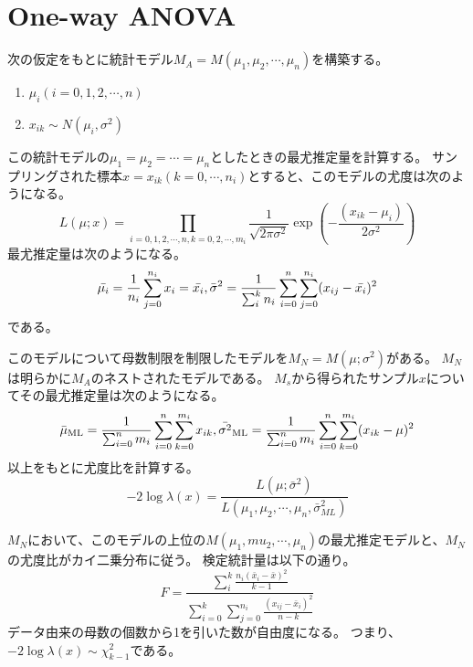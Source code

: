 \section{One-way ANOVA}
次の仮定をもとに統計モデル$M_A=M(\mu_1,\mu_2,\cdots,\mu_n)$を構築する。
\begin{enumerate}
    \item $\mu_i (i=0,1,2,\cdots,n)$
    \item $x_{ik} \sim N(\mu_i,\sigma^2)$
\end{enumerate}
この統計モデルの$\mu_1=\mu_2=\cdots=\mu_n$としたときの最尤推定量を計算する。
サンプリングされた標本$x = x_{ik} (k=0,\cdots,n_i)$とすると、このモデルの尤度は次のようになる。
\begin{equation*}
    L(\mu;x) = \prod_{i=0,1,2,\cdots,n,k=0,2,\cdots,m_i}\frac{1}{\sqrt{2\pi\sigma^2}}\exp(-\frac{(x_{ik}-\mu_i)}{2\sigma^2})
\end{equation*}
最尤推定量は次のようになる。
\begin{equation*}
    \bar{\mu_i} = \frac{1}{n_i}\sum_{j=0}^{n_i} x_i = \bar{x_i},\\
    \bar{\sigma}^2 = \frac{1}{\sum_{i}^k n_i} \sum_{i=0}^n \sum_{j=0}^{n_i} (x_{ij}-\bar{x_i})^2
\end{equation*}
である。

このモデルについて母数制限を制限したモデルを$M_N=M(\mu;\sigma^2)$がある。
$M_N$は明らかに$M_A$のネストされたモデルである。
$M_s$から得られたサンプル$x$についてその最尤推定量は次のようになる。
\begin{equation*}
    \bar{\mu}_{\rm{ML}} = \frac{1}{\sum_{i=0}^n m_i} \sum_{i=0}^n\sum_{k=0}^{m_i} x_{ik}, \\
    \bar{\sigma^2}_{\rm{ML}} =  \frac{1}{\sum_{i=0}^n m_i} \sum_{i=0}^n \sum_{k=0}^{m_i}(x_{ik} -\mu)^2
\end{equation*}
以上をもとに尤度比を計算する。
\begin{equation*}
    -2\log \lambda(x) = \frac{L(\mu;\bar{\sigma}^2)}{L(\mu_1,\mu_2,\cdots,\mu_n,\bar{\sigma}^2_{ML})}
\end{equation*}

$M_N$において、このモデルの上位の$M(\mu_1,mu_2,\cdots,\mu_n)$の最尤推定モデルと、$M_N$の尤度比がカイ二乗分布に従う。
検定統計量は以下の通り。
\begin{equation*}
    F = \frac{\sum_i^k \frac{n_i (\bar{x}_i-\bar{x})^2}{k-1}}{ \sum_{i=0}^k\sum_{j=0}^{n_i}\frac{ (x_{ij}-\bar{x}_i)^2 }{n-k}}
\end{equation*}
データ由来の母数の個数から1を引いた数が自由度になる。
つまり、
$-2\log\lambda(x)\sim \chi^2_{k-1}$である。

